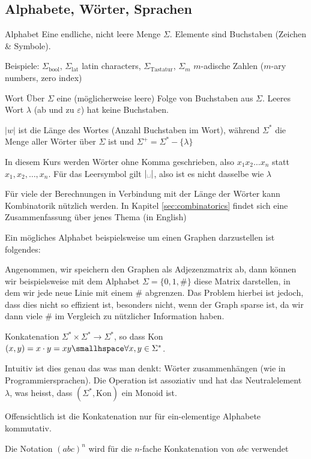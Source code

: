 \subsection{Alphabete, Wörter, Sprachen}

\begin{definition}[]{Alphabet}
    Eine endliche, nicht leere Menge $\Sigma$. Elemente sind Buchstaben (Zeichen \& Symbole). 

    Beispiele: $\Sigma_{\text{bool}}$, $\Sigma_{\text{lat}}$ latin characters, $\Sigma_{\text{Tastatur}}$, $\Sigma_m$ $m$-adische Zahlen ($m$-ary numbers, zero index)
\end{definition}

\begin{definition}[]{Wort}
    Über $\Sigma$ eine (möglicherweise leere) Folge von Buchstaben aus $\Sigma$. Leeres Wort $\lambda$ (ab und zu $\varepsilon$) hat keine Buchstaben.

    $|w|$ ist die Länge des Wortes (Anzahl Buchstaben im Wort), während $\Sigma^*$ die Menge aller Wörter über $\Sigma$ ist und $\Sigma^+ = \Sigma^* - \{\lambda\}$

    In diesem Kurs werden Wörter ohne Komma geschrieben, also $x_1x_2\ldots x_n$ statt $x_1, x_2, \ldots, x_n$.
    Für das Leersymbol gilt $|\text{\textvisiblespace}|$, also ist es nicht dasselbe wie $\lambda$
\end{definition}

Für viele der Berechnungen in Verbindung mit der Länge der Wörter kann Kombinatorik nützlich werden. 
In Kapitel \ref{sec:combinatorics} findet sich eine Zusammenfassung über jenes Thema (in English)

Ein mögliches Alphabet beispielsweise um einen Graphen darzustellen ist folgendes: 

Angenommen, wir speichern den Graphen als Adjezenzmatrix ab, dann können wir beispielsweise mit dem Alphabet $\Sigma = \{0, 1, \#\}$ diese Matrix darstellen, in dem wir jede neue Linie mit einem $\#$ abgrenzen.
Das Problem hierbei ist jedoch, dass dies nicht so effizient ist, besonders nicht, wenn der Graph sparse ist, da wir dann viele \# im Vergleich zu nützlicher Information haben.

\begin{definition}[]{Konkatenation}
    $\Sigma^* \times \Sigma^* \rightarrow \Sigma^*$, so dass Kon$(x, y) = x \cdot y = xy \smallhspace \forall x, y \in \Sigma^*$.

    Intuitiv ist dies genau das was man denkt: Wörter zusammenhängen (wie in Programmiersprachen). 
    Die Operation ist assoziativ und hat das Neutralelement $\lambda$, was heisst, dass $(\Sigma^*, \text{Kon})$ ein Monoid ist.

    Offensichtlich ist die Konkatenation nur für ein-elementige Alphabete kommutativ.

    Die Notation $(abc)^n$ wird für die $n$-fache Konkatenation von $abc$ verwendet
\end{definition}


